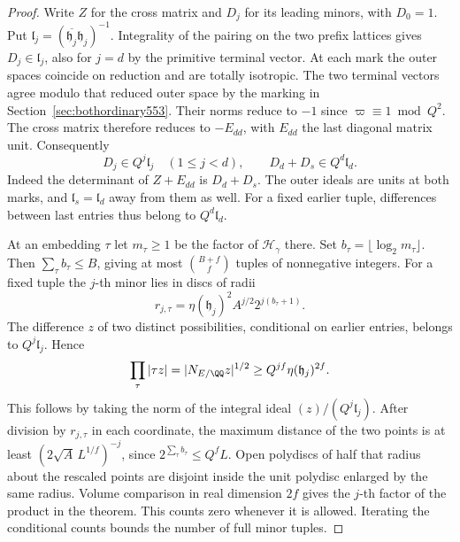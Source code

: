 \documentclass[a4paper,11pt]{article}
\theoremstyle{definition}
\theoremstyle{remark}
\numberwithin{equation}{section}
\begin{document}
\begin{proof}
Write \(Z\) for the cross matrix and \(D_j\) for its leading
minors, with \(D_0=1\). Put
\(\mathfrak l_j=(\overline{\mathfrak h_j}\mathfrak h_j)^{-1}\).
Integrality of the pairing on the two prefix lattices gives
\(D_j\in\mathfrak l_j\), also for \(j=d\) by the primitive
terminal vector. At each mark the outer spaces coincide on
reduction and are totally isotropic. The two terminal vectors
agree modulo that reduced outer space by the marking in
Section~\ref{sec:bothordinary553}. Their norms reduce to
\(-1\) since \(\varpi\equiv1\bmod Q^2\). The cross matrix
therefore reduces to \(-E_{dd}\), with \(E_{dd}\) the last
diagonal matrix unit. Consequently
\[
  D_j\in Q^j\mathfrak l_j\quad(1\le j<d),\qquad
              D_d+D_s\in Q^d\mathfrak l_d .
\]
Indeed the determinant of \(Z+E_{dd}\) is \(D_d+D_s\).
The outer ideals are units at both marks, and
\(\mathfrak l_s=\mathfrak l_d\) away from them as well.
For a fixed earlier tuple, differences between last entries
thus belong to \(Q^d\mathfrak l_d\).

At an embedding \(\tau\) let \(m_\tau\ge1\) be the factor
of \(\mathcal H_\gamma\) there. Set
\(b_\tau=\lfloor\log_2 m_\tau\rfloor\). Then
\(\sum_\tau b_\tau\le B\), giving at most
\(\binom{B+f}{f}\) tuples of nonnegative integers.
For a fixed tuple the \(j\)-th minor lies in discs of radii
\[
    r_{j,\tau}=\eta(\mathfrak h_j)^2 A^{j/2}2^{j(b_\tau+1)} .
\]
The difference \(z\) of two distinct possibilities, conditional
on earlier entries, belongs to \(Q^j\mathfrak l_j\). Hence
\[
       \prod_\tau|\tau z|=|N_{E/\QQ}z|^{1/2}
                   \ge Q^{jf}\eta(\mathfrak h_j)^{2f}.
\]
This follows by taking the norm of the integral ideal
\((z)/(Q^j\mathfrak l_j)\). After division by \(r_{j,\tau}\)
in each coordinate, the maximum distance of the two points
is at least \((2\sqrt A\,L^{1/f})^{-j}\), since
\(2^{\sum_\tau b_\tau}\le Q^fL\). Open polydiscs of half
that radius about the rescaled points are disjoint inside
the unit polydisc enlarged by the same radius. Volume
comparison in real dimension \(2f\) gives the \(j\)-th
factor of the product in the theorem. This counts zero
whenever it is allowed. Iterating the conditional counts
bounds the number of full minor tuples.


\end{proof}
\end{document}
